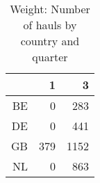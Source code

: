 \begin{table}[ht]
\centering
\begin{tabular}{rrr}
  \hline
 & 1 & 3 \\ 
  \hline
BE & 0 & 283 \\ 
  DE & 0 & 441 \\ 
  GB & 379 & 1152 \\ 
  NL & 0 & 863 \\ 
   \hline
\end{tabular}
\caption{Weight: Number of hauls by country and quarter} 
\end{table}
